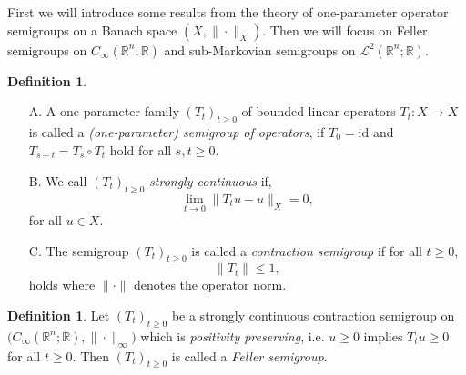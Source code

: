 \documentclass[a4paper, 12pt]{report}
\theoremstyle{cor}
\theoremstyle{remark}
\theoremstyle{definition}
\newtheorem{defn}[theorem]{Definition}
\begin{document}
First we will introduce some results from the theory of one-parameter operator semigroups on a Banach space $(X, \|\cdot\|_X)$.  Then we will focus on Feller semigroups on $C_\infty(\mathbb{R}^n; \mathbb{R})$ and sub-Markovian semigroups on $\mathcal{L}^2(\mathbb{R}^n; \mathbb{R})$.
\begin{defn}
\hspace{0.5cm}
\begin{itemize}
\item[A.] A one-parameter family $(T_t)_{t \ge 0}$ of bounded linear operators $T_t : X \to X$ is called a \emph{(one-parameter) semigroup of operators}, if $T_0 = \mathrm{id}$ and $T_{s + t} = T_s \circ T_t$ hold for all $s, t \ge 0$.

\item[B.] We call $(T_t)_{t \ge 0}$ \emph{strongly continuous} if,
\begin{equation}
\lim_{t \to 0}\|T_tu - u\|_X = 0,
\end{equation}
for all $u \in X$.

\item[C.] The semigroup $(T_t)_{t \ge 0}$ is called a \emph{contraction semigroup} if for all $t \ge 0$,
\begin{equation}
\|T_t\| \le 1,
\end{equation}
holds where $\|\cdot\|$ denotes the operator norm.
\end{itemize}
\end{defn}

\begin{defn}
Let $(T_t)_{t \ge 0}$ be a strongly continuous contraction semigroup on $\big(C_\infty(\mathbb{R}^n; \mathbb{R}), \|\cdot\|_\infty\big)$ which is \emph{positivity preserving}, i.e. $u \ge 0$ implies $T_tu \ge 0$ for all $t \ge 0$.  Then $(T_t)_{t \ge 0}$ is called a \emph{Feller semigroup}.
\end{defn}
\end{document}
